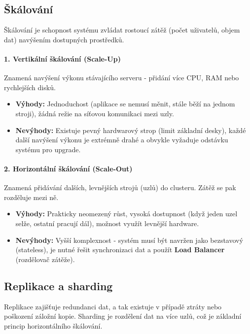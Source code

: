 \subsection{Škálování}
Škálování je schopnost systému zvládat rostoucí zátěž (počet uživatelů, objem dat) navýšením dostupných prostředků.

\paragraph*{1. Vertikální škálování (Scale-Up)}
Znamená navýšení výkonu stávajícího serveru - přidání více CPU, RAM nebo rychlejších disků.
\begin{itemize}
    \item \textbf{Výhody:} Jednoduchost (aplikace se nemusí měnit, stále běží na jednom stroji), žádná režie na síťovou komunikaci mezi uzly.
    \item \textbf{Nevýhody:} Existuje pevný hardwarový strop (limit základní desky), každé další navýšení výkonu je extrémně drahé a obvykle vyžaduje odstávku systému pro upgrade.
\end{itemize}

\paragraph*{2. Horizontální škálování (Scale-Out)}
Znamená přidávání dalších, levnějších strojů (uzlů) do clusteru. Zátěž se pak rozděluje mezi ně.
\begin{itemize}
    \item \textbf{Výhody:} Prakticky neomezený růst, vysoká dostupnost (když jeden uzel selže, ostatní pracují dál), možnost využít levnější hardware.
    \item \textbf{Nevýhody:} Vyšší komplexnost - systém musí být navržen jako bezstavový (stateless), je nutné řešit synchronizaci dat a použít \textbf{Load Balancer} (rozdělovač zátěže).
\end{itemize}

\subsection{Replikace a sharding}
Replikace zajišťuje redundanci dat, a tak existuje v případě ztráty nebo poškození
záložní kopie. Sharding je rozdělení dat na více uzlů, což je základní princip
horizontálního škálování.

